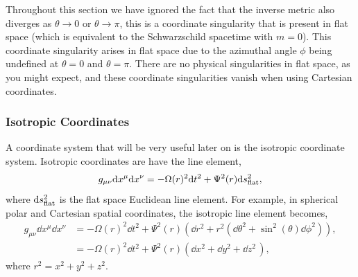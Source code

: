 Throughout this section we have ignored the fact that the inverse metric also diverges as $\theta\rightarrow 0$ or $\theta \rightarrow \pi$, this is a coordinate singularity that is present in flat space (which is equivalent to the Schwarzschild spacetime with $m=0$). This coordinate singularity arises in flat space due to the azimuthal angle $\phi$ being undefined at $\theta=0$ and $\theta=\pi$. There are no physical singularities in flat space, as you might expect, and these coordinate singularities vanish when using Cartesian coordinates.




\subsubsection{Isotropic Coordinates}
A coordinate system that will be very useful later on is the isotropic coordinate system. Isotropic coordinates are have the line element,
\begin{align}
g_{\mu\nu} \dd x^\mu \dd x^\nu = -\Omega(r)^2 \dd t^2 + \Psi^2(r) \dd s^2_{\rm flat},
\end{align}
where $\dd s^2_{\rm flat}$ is the flat space Euclidean line element. For example, in spherical polar and Cartesian spatial coordinates, the isotropic line element becomes,
\begin{align}
g_{\mu\nu} \dd x^\mu \dd x^\nu &= -\Omega(r)^2 \dd t^2 + \Psi^2(r) \left( \dd r^2 + r^2 \left( \dd \theta^2 + \sin^2(\theta) \dd \phi^2 \right)\right) ,\\
 &= -\Omega(r)^2 \dd t^2 + \Psi^2(r) \left( {\dd x^2 + \dd y^2 + \dd z^2 }\,\right),
\end{align}
where $r^2 = x^2 + y^2 + z^2$. 

